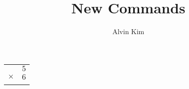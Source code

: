 \documentclass{article}
\title{New Commands}
\author{Alvin Kim}
\newcommand{\multiplication}[2]{
    \begin{tabular}{r r}
        &$#1$\\
        $\times$ &$#2$\\
        \hline
        &\pgfmathparse{#1*#2}
        \pgfmathresult
    \end{tabular}
}
\begin{document}
    \maketitle

    \multiplication{5}{6}
\end{document}
